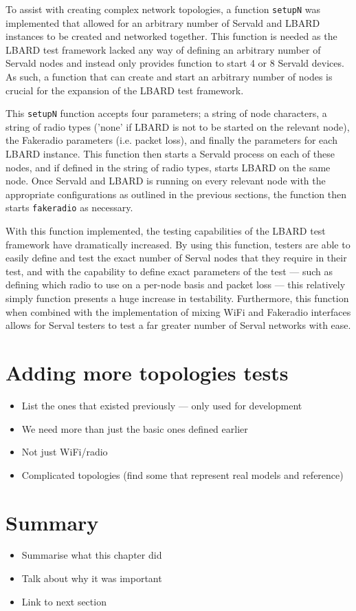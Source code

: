To assist with creating complex network topologies, a function \verb|setupN| was implemented that allowed for an arbitrary number of Servald and LBARD instances to be created and networked together.
This function is needed as the LBARD test framework lacked any way of defining an arbitrary number of Servald nodes and instead only provides function to start 4 or 8 Servald devices.
As such, a function that can create and start an arbitrary number of nodes is crucial for the expansion of the LBARD test framework.

This \verb|setupN| function accepts four parameters; a string of node characters, a string of radio types ('none' if LBARD is not to be started on the relevant node), the Fakeradio parameters (i.e. packet loss), and finally the parameters for each LBARD instance.
This function then starts a Servald process on each of these nodes, and if defined in the string of radio types, starts LBARD on the same node.
Once Servald and LBARD is running on every relevant node with the appropriate configurations as outlined in the previous sections, the function then starts \verb|fakeradio| as necessary.

With this function implemented, the testing capabilities of the LBARD test framework have dramatically increased.
By using this function, testers are able to easily define and test the exact number of Serval nodes that they require in their test, and with the capability to define exact parameters of the test — such as defining which radio to use on a per-node basis and packet loss — this relatively simply function presents a huge increase in testability.
Furthermore, this function when combined with the implementation of mixing WiFi and Fakeradio interfaces allows for Serval testers to test a far greater number of Serval networks with ease.


\section{Adding more topologies tests}


\begin{itemize}
    \item List the ones that existed previously — only used for development
    \item We need more than just the basic ones defined earlier
    \item Not just WiFi/radio
    \item Complicated topologies (find some that represent real models and reference)
\end{itemize}

\section{Summary}
\begin{itemize}
    \item Summarise what this chapter did
    \item Talk about why it was important
    \item Link to next section
\end{itemize}
